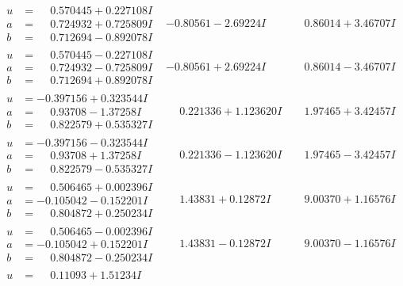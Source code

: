 \documentclass[1p]{elsarticle_modified}
\theoremstyle{definition}
\begin{document}
$$\begin{array}{c|c|c}
 \hline 
\begin{aligned}
u &= \phantom{-}0.570445 + 0.227108 I \\
a &= \phantom{-}0.724932 + 0.725809 I \\
b &= \phantom{-}0.712694 - 0.892078 I\end{aligned}
 & -0.80561 - 2.69224 I & \phantom{-}0.86014 + 3.46707 I \\ \hline\begin{aligned}
u &= \phantom{-}0.570445 - 0.227108 I \\
a &= \phantom{-}0.724932 - 0.725809 I \\
b &= \phantom{-}0.712694 + 0.892078 I\end{aligned}
 & -0.80561 + 2.69224 I & \phantom{-}0.86014 - 3.46707 I \\ \hline\begin{aligned}
u &= -0.397156 + 0.323544 I \\
a &= \phantom{-}0.93708 - 1.37258 I \\
b &= \phantom{-}0.822579 + 0.535327 I\end{aligned}
 & \phantom{-}0.221336 + 1.123620 I & \phantom{-}1.97465 + 3.42457 I \\ \hline\begin{aligned}
u &= -0.397156 - 0.323544 I \\
a &= \phantom{-}0.93708 + 1.37258 I \\
b &= \phantom{-}0.822579 - 0.535327 I\end{aligned}
 & \phantom{-}0.221336 - 1.123620 I & \phantom{-}1.97465 - 3.42457 I \\ \hline\begin{aligned}
u &= \phantom{-}0.506465 + 0.002396 I \\
a &= -0.105042 - 0.152201 I \\
b &= \phantom{-}0.804872 + 0.250234 I\end{aligned}
 & \phantom{-}1.43831 + 0.12872 I & \phantom{-}9.00370 + 1.16576 I \\ \hline\begin{aligned}
u &= \phantom{-}0.506465 - 0.002396 I \\
a &= -0.105042 + 0.152201 I \\
b &= \phantom{-}0.804872 - 0.250234 I\end{aligned}
 & \phantom{-}1.43831 - 0.12872 I & \phantom{-}9.00370 - 1.16576 I \\ \hline\begin{aligned}
u &= \phantom{-}0.11093 + 1.51234 I \\

\end{aligned}
\end{array}$$
\end{document}
